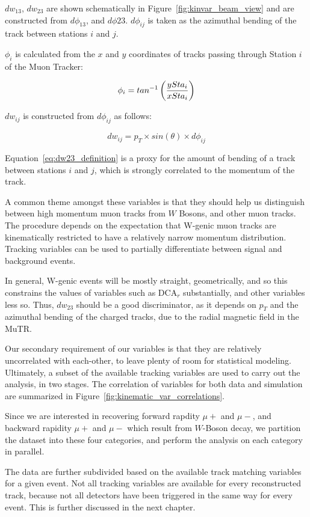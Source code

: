 $dw_{13}$, $dw_{23}$ are shown schematically in
Figure~\ref{fig:kinvar_beam_view} and are constructed from $d\phi_{13}$, and
$d\phi{23}$.  $d\phi_{ij}$ is taken as the azimuthal bending of the track
between stations $i$ and $j$. 


\noindent$\phi_{i}$ is calculated from the $x$ and $y$ coordinates of tracks
passing through Station $i$ of the Muon Tracker:

\begin{equation}
  \phi_i = tan^{-1}\left({ySta_i \over xSta_i}\right)
  \label{eq:phi_definition}
\end{equation}

\noindent$dw_{ij}$ is constructed from $d\phi_{ij}$ as follows:

\begin{equation}
  dw_{ij} = p_T \times sin(\theta) \times d\phi_{ij}
  \label{eq:dw23_definition}
\end{equation}

{\noindent}Equation~\ref{eq:dw23_definition} is a proxy for the amount of
bending of a track between stations $i$ and $j$, which is strongly correlated to
the momentum of the track. 

A common theme amongst these variables is that they should help us distinguish
between high momentum muon tracks from $W$ Bosons, and other muon tracks. The
procedure depends on the expectation that W-genic muon tracks are kinematically
restricted to have a relatively narrow momentum distribution. Tracking variables
can be used to partially differentiate between signal and background events.

In general, W-genic events will be mostly straight, geometrically, and so this
constrains the values of variables such as DCA${}_r$ substantially, and other
variables less so. Thus, $dw_{23}$ should be a good discriminator, as it depends
on $p_T$ and the azimuthal bending of the charged tracks, due to the radial
magnetic field in the MuTR.

Our secondary requirement of our variables is that they are relatively
uncorrelated with each-other, to leave plenty of room for statistical modeling.
Ultimately, a subset of the available tracking variables are used to carry out
the analysis, in two stages. The correlation of variables for both data and
simulation are summarized in Figure~\ref{fig:kinematic_var_correlations}.


Since we are interested in recovering forward rapdity $\mu+$ and $\mu-$, and
backward rapidity $\mu+$ and $\mu-$ which result from $W$-Boson decay, we
partition the dataset into these four categories, and perform the analysis on
each category in parallel. 

The data are further subdivided based on the available track matching variables
for a given event. Not all tracking variables are available for every
reconstructed track, because not all detectors have been triggered in the same
way for every event. This is further discussed in the next chapter.

\clearpage
